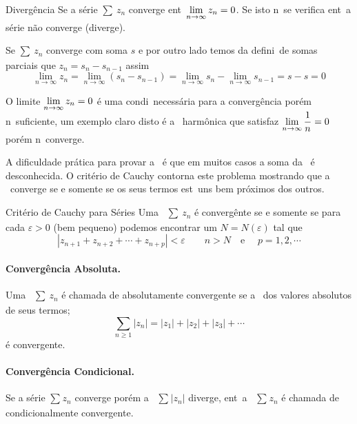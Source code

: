 \begin{theoc}{Diverg\^encia}{}
Se a s\'erie $\sum_{}\,z_{n}$ converge ent\ao\
$\displaystyle{\lim_{n\to \infty}z_n=0}$. Se isto n\ao\  se verifica
ent\ao\ a s\'erie n\~{a}o converge (diverge).
\end{theoc}

\begin{prvc}{}{}
Se $\sum_{}\,z_{n}$ converge
com soma $s$ e por outro lado temos da defini\cao\ de somas
parciais que $z_n=s_n-s_{n-1}$ assim
\begin{equation*}
\lim_{n\to \infty}z_n=\lim_{n\to \infty}(s_n-s_{n-1})=\lim_{n\to
\infty}s_n-\lim_{n\to \infty}s_{n-1}=s-s=0
\end{equation*}
\end{prvc}

\begin{obs}
O limite $\displaystyle{\lim_{n\to \infty}z_n=0}$ \'e uma condi\cao\
necess\'aria para a converg\^encia por\'em n\ao\ suficiente, um
exemplo claro disto \'e a \ser\ harm\^onica que satisfaz
$\displaystyle{\lim_{n\to \infty}\frac{1}{n}=0}$ por\'em n\ao\ converge.
\end{obs}

A dificuldade pr\'{a}tica para provar a \conver\ \'e que em muitos
casos a soma da \ser\ \'e desconhecida. O crit\'erio de Cauchy
contorna este problema mostrando que a \ser\ converge se e somente
se os seus termos est\ao\ uns bem pr\'oximos dos outros.

\begin{theoc}{Crit\'erio de Cauchy para S\'eries}{}
Uma \ser\ $\sum_{}\,z_{n}$ \'e converg\^ente se e
somente se para cada $\varepsilon>0$ (bem pequeno) podemos
encontrar um $N=N(\varepsilon)$ tal que
\begin{equation}\label{cauchy}
  |z_{n+1}+z_{n+2}+\cdots+z_{n+p}|<\varepsilon \qquad n>N \quad \text{e
  }\quad p=1,2,\cdots
\end{equation}
\end{theoc}

\paragraph{Converg\^encia Absoluta.} 
Uma \ser\
$\sum_{}\,z_{n}$ \'e chamada de absolutamente
convergente se a \ser\ dos valores absolutos de seus termos;
\begin{equation*}
\sum_{n\geq 1}|z_n|=|z_1|+|z_2|+|z_3|+\cdots
\end{equation*}
\'e convergente.

\paragraph{Converg\^encia Condicional.} 
Se a série 
$\sum_{}z_{n}$ converge por\'em a \ser\
$\sum_{}|z_n|$ diverge, ent\ao\ a \ser\
$\sum_{}z_{n}$ \'e chamada de condicionalmente convergente.

